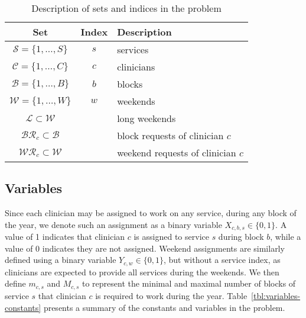 \begin{table}[h]
	\centering
  \caption{Description of sets and indices in the problem}%
  \label{tbl:sets-indices}
	\begin{tabular}{ c c l }
		\toprule
		\textbf{Set}                         & \textbf{Index} & \textbf{Description}  
		\\ \midrule
		$\mathcal{S} = \{1, \ldots, S \}$    & $s$            & services              
		\\
		$\mathcal{C} = \{1, \ldots, C \}$    & $c$            & clinicians            
		\\
		$\mathcal{B} = \{1, \ldots, B \}$    & $b$            & blocks                
		\\
		$\mathcal{W} = \{1, \ldots, W \}$    & $w$            & weekends              
		\\
		$\mathcal{L} \subset \mathcal{W}$    &                & long weekends         
		\\
		$\mathcal{BR}_c \subset \mathcal{B}$ &                & block requests of
		clinician $c$   \\
		$\mathcal{WR}_c \subset \mathcal{W}$ &                & weekend requests of
		clinician $c$ \\
    \bottomrule
	\end{tabular}
	
\end{table}

\subsection{Variables}\label{sec:meth-variables}
Since each clinician may be assigned to work on any service, during any block of
the year, we denote such an assignment as a binary variable $X_{c, b, s} \in \{0,1\}$.
A value of 1 indicates that clinician $c$ is assigned to service $s$ during block $b$,
while a value of 0 indicates they are not assigned.
Weekend assignments are similarly defined using a binary
variable $Y_{c, w} \in \{0,1\}$, but without a service index, as clinicians are expected to
provide all services during the weekends. We then define
$m_{c, s}$ and $M_{c, s}$ to represent the minimal and maximal number of blocks of service $s$
that clinician $c$ is required to work during the year.
Table~\ref{tbl:variables-constants} presents a summary of the constants and variables
in the problem.

